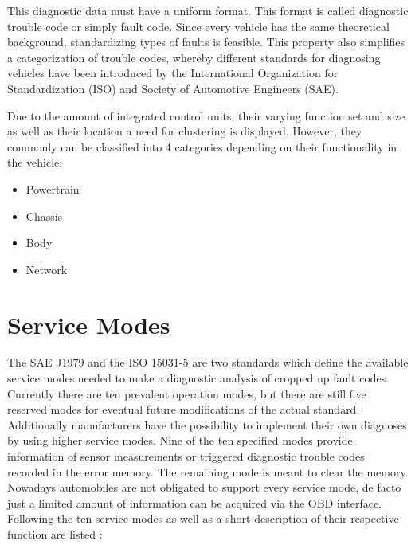 This diagnostic data must have a uniform format. This format is called diagnostic trouble code or simply fault code. Since every 
vehicle has the same theoretical background, standardizing types of faults is feasible. This property also simplifies a categorization 
of trouble codes, whereby different standards for diagnosing vehicles have been introduced by the International Organization for 
Standardization (ISO) and Society of Automotive Engineers (SAE). 

Due to the amount of integrated control units, their varying function set and size as well as their location a need for clustering is 
displayed. However, they commonly can be classified into 4 categories depending on their functionality in the vehicle:
\begin{itemize}
 \item Powertrain 
 \item Chassis 
 \item Body 
 \item Network
\end{itemize}

\section{Service Modes}
\label{sec:servicemodes}

The SAE J1979 and the ISO 15031-5 are two standards which define the available service modes needed to make a diagnostic analysis of cropped up fault codes. Currently there are ten prevalent operation modes, but there are still five reserved modes for eventual future modifications of the actual standard. Additionally manufacturers have the possibility to implement their own diagnoses by using higher service modes.
Nine of the ten specified modes provide information of sensor measurements or triggered diagnostic trouble codes recorded in the error memory. The remaining mode is meant to clear the memory. Nowadays automobiles are not obligated to support every service  mode, de facto just a limited amount of information can be acquired via the OBD interface.
Following the ten service modes as well as a short description of their respective function are listed \cite{SCHAFOBD2}:

